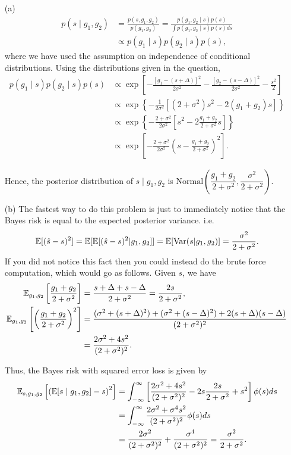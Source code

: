\begin{enumerate}
\item[(a)] 
\begin{align*}
p(s \mid g_1, g_2) &= \frac{p(s, g_1, g_2)}{p(g_1, g_2)} = \frac{p(g_1, g_2 \mid s) p(s)}{\int p(g_1, g_2 \mid s) p(s) ds} \\ 
&\propto p(g_1 \mid s) p(g_2 \mid s) p(s),
\end{align*}
where we have used the assumption on independence of conditional distributions. Using the distributions given in the question,
\begin{align*}
p(g_1 \mid s) p(g_2 \mid s) p(s) &\propto \exp \left[ - \frac{[g_1 - (s+\Delta)]^2}{2\sigma^2} - \frac{[g_2 - (s-\Delta)]^2}{2\sigma^2} - \frac{s^2}{2} \right] \\ 
&\propto \exp \left\{ - \frac{1}{2\sigma^2} \left[ (2 + \sigma^2)s^2 - 2(g_1 + g_2) s \right] \right\} \\ 
&\propto \exp \left\{ - \frac{2 + \sigma^2}{2\sigma^2} \left[ s^2 - 2 \frac{g_1 + g_2}{2 + \sigma^2} s \right] \right\} \\ 
&\propto \exp \left[ - \frac{2 + \sigma^2}{2\sigma^2} \left( s - \frac{g_1 + g_2}{2 + \sigma^2} \right)^2 \right].
\end{align*}

Hence, the posterior distribution of $s \mid g_1, g_2$ is $\text{Normal}\left( \dfrac{g_1 + g_2}{2 + \sigma^2}, \dfrac{\sigma^2}{2 + \sigma^2} \right)$.

\item[(b)] The fastest way to do this problem is just to immediately notice that the Bayes risk is equal to the expected posterior variance. i.e.
\[
\mathbb{E}[(\hat{s} - s)^2] = \mathbb{E}[\mathbb{E}[(\hat{s} - s)^2|g_1,g_2]] = \mathbb{E}[\text{Var}(s|g_1,g_2)] = \frac{\sigma^2}{2+\sigma^2}.
\]
If you did not notice this fact then you could instead do the brute force computation, which would go as follows. Given $s$, we have
\begin{align*}
{\mathbb E}_{g_1, g_2} \left[ \dfrac{g_1 + g_2}{2 + \sigma^2} \right] &= \frac{s + \Delta + s - \Delta}{2 + \sigma^2} = \frac{2s}{2 + \sigma^2}, \\ 
{\mathbb E}_{g_1, g_2} \left[ \left(\dfrac{g_1 + g_2}{2 + \sigma^2}\right)^2 \right] &= \frac{(\sigma^2 + (s + \Delta)^2) + (\sigma^2 + (s - \Delta)^2) + 2 (s + \Delta)(s - \Delta) }{(2 + \sigma^2)^2} \\ 
&= \frac{2\sigma^2 + 4s^2}{(2 + \sigma^2)^2}.
\end{align*}

Thus, the Bayes risk with squared error loss is given by
\begin{align*}
{\mathbb E}_{s, g_1, g_2} \left[ \left( {\mathbb E} [s \mid g_1, g_2] - s \right)^2 \right] &= \int_{-\infty}^\infty \left[\frac{2\sigma^2 + 4s^2}{(2 + \sigma^2)^2} - 2s \frac{2s}{2 + \sigma^2} + s^2 \right] \phi(s)ds \\ 
&= \int_{-\infty}^\infty \frac{2 \sigma^2 + \sigma^4 s^2}{(2 + \sigma^2)^2} \phi(s) ds \\ 
&= \frac{2\sigma^2}{(2 + \sigma^2)^2} + \frac{\sigma^4}{(2 + \sigma^2)^2} = \frac{\sigma^2}{2 + \sigma^2}.
\end{align*}


\end{enumerate}
